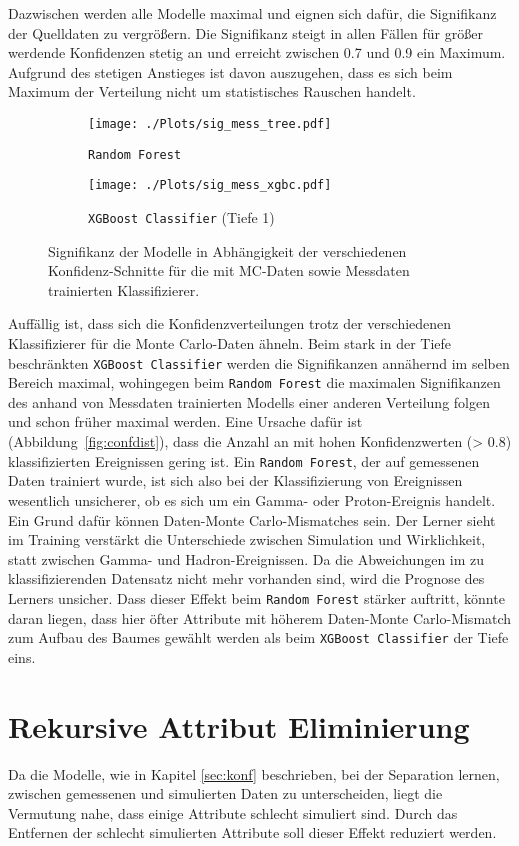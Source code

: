 Dazwischen werden alle Modelle maximal und eignen sich dafür, die Signifikanz der Quelldaten zu vergrößern.
Die Signifikanz steigt in allen Fällen für größer werdende Konfidenzen stetig an und erreicht zwischen \num{0.7} und \num{0.9} ein Maximum.
Aufgrund des stetigen Anstieges ist davon auszugehen, dass es sich beim Maximum der Verteilung nicht um statistisches Rauschen handelt.
\begin{figure}[H]
  \centering
  \begin{subfigure}[b]{0.48\textwidth}
  \centering
  \texttt{[image: ./Plots/sig\_mess\_tree.pdf]}
  \caption{\texttt{Random Forest}}
  \label{fig:signconfMC}
\end{subfigure}
\begin{subfigure}[b]{0.48\textwidth}
  \centering
  \texttt{[image: ./Plots/sig\_mess\_xgbc.pdf]}
  \caption{\texttt{XGBoost Classifier} (Tiefe 1)}
  \label{fig:signconfMESS}
\end{subfigure}
\caption{Signifikanz der Modelle in Abhängigkeit der verschiedenen Konfidenz-Schnitte für die mit MC-Daten sowie Messdaten trainierten Klassifizierer.}
\label{fig:signconf}
\end{figure}
Auffällig ist, dass sich die Konfidenzverteilungen trotz der verschiedenen Klassifizierer für die Monte Carlo-Daten ähneln.
Beim stark in der Tiefe beschränkten \texttt{XGBoost Classifier} werden die Signifikanzen annähernd im selben Bereich maximal, wohingegen beim \texttt{Random Forest} die maximalen Signifikanzen des anhand von Messdaten trainierten Modells einer anderen Verteilung folgen und schon früher maximal werden. 
Eine Ursache dafür ist (Abbildung~\ref{fig:confdist}), dass die Anzahl an mit hohen Konfidenzwerten (\num{> 0.8}) klassifizierten Ereignissen gering ist. 
Ein \texttt{Random Forest}, der auf gemessenen Daten trainiert wurde, ist sich also bei der Klassifizierung von Ereignissen wesentlich unsicherer, ob es sich um ein Gamma- oder Proton-Ereignis handelt.
Ein Grund dafür können Daten-Monte Carlo-Mismatches sein. 
Der Lerner sieht im Training verstärkt die Unterschiede zwischen Simulation und Wirklichkeit, statt zwischen Gamma- und Hadron-Ereignissen.
Da die Abweichungen im zu klassifizierenden Datensatz nicht mehr vorhanden sind, wird die Prognose des Lerners unsicher.
Dass dieser Effekt beim \texttt{Random Forest} stärker auftritt, könnte daran liegen, dass hier öfter Attribute mit höherem Daten-Monte Carlo-Mismatch zum Aufbau des Baumes gewählt werden als beim \texttt{XGBoost Classifier} der Tiefe eins.
\newpage
\section{Rekursive Attribut Eliminierung}
Da die Modelle, wie in Kapitel \ref{sec:konf} beschrieben, bei der Separation lernen, zwischen gemessenen und simulierten Daten zu unterscheiden, liegt die Vermutung nahe, dass einige Attribute schlecht simuliert sind.
Durch das Entfernen der schlecht simulierten Attribute soll dieser Effekt reduziert werden.

